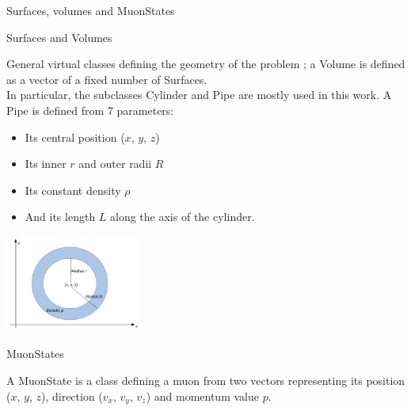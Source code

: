 \documentclass[handout,8 pt]{beamer}
\begin{document}
\begin{frame}{Surfaces, volumes and MuonStates}
\justifying
\begin{minipage}[c]{.65\textwidth}
\begin{exampleblock}{} Surfaces and Volumes \end{exampleblock}
\justifying
General virtual classes defining the geometry of the problem ; a Volume is defined as a vector of a fixed number of Surfaces. \\ \vspace{5pt}
In particular, the subclasses Cylinder and Pipe are mostly used in this work. A Pipe is defined from 7 parameters: 
\begin{itemize}
\item Its central position ($x$, $y$, $z$)
\item Its inner $r$ and outer radii $R$
\item Its constant density $\rho$
\item And its length $L$ along the axis of the cylinder.
\end{itemize}
\end{minipage}
\begin{minipage}[c]{.33\textwidth}
\vspace{35pt}
\includegraphics[width=4.5cm, height=3.2cm]{figs/cylinder.png}
\end{minipage} \vfill
\begin{exampleblock}{} MuonStates \end{exampleblock}
A MuonState is a class defining a muon from two vectors representing its position ($x$, $y$, $z$), direction ($v_x$, $v_y$, $v_z$) and momentum value $p$. \\ \vspace{10pt}

\end{frame}
\end{document}

